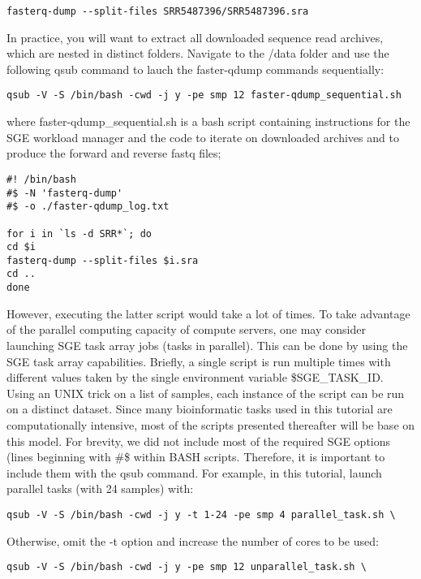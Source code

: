 \begin{verbatim}
fasterq-dump --split-files SRR5487396/SRR5487396.sra
\end{verbatim}

In practice, you will want to extract all downloaded sequence read archives, which are nested in distinct folders. Navigate to the /data folder and use the following qsub command to lauch the faster-qdump commands sequentially:

\begin{verbatim}
qsub -V -S /bin/bash -cwd -j y -pe smp 12 faster-qdump_sequential.sh
\end{verbatim}

where faster-qdump\_sequential.sh is a bash script containing instructions for the SGE workload manager and the code to iterate on downloaded archives and to produce the forward and reverse fastq files;

\begin{verbatim}
#! /bin/bash
#$ -N 'fasterq-dump'
#$ -o ./faster-qdump_log.txt
	
for i in `ls -d SRR*`; do
cd $i
fasterq-dump --split-files $i.sra
cd ..
done
\end{verbatim}


However, executing the latter script would take a lot of times. To take advantage of the parallel computing capacity of compute servers, one may consider launching SGE task array jobs (tasks in parallel). This can be done by using the SGE task array capabilities. Briefly, a single script is run multiple times with different values taken by the single environment variable \$SGE\_TASK\_ID. Using an UNIX trick on a list of samples, each instance of the script can be run on a distinct dataset. Since many bioinformatic tasks used in this tutorial are computationally intensive, most of the scripts presented thereafter will be base on this model. For brevity, we did not include most of the required SGE options (lines beginning with \#\$ within BASH scripts. Therefore, it is important to include them with the qsub command. For example, in this tutorial, launch parallel tasks (with 24 samples) with:
\begin{verbatim}
qsub -V -S /bin/bash -cwd -j y -t 1-24 -pe smp 4 parallel_task.sh \
\end{verbatim}

Otherwise, omit the -t option and increase the number of cores to be used:
\begin{verbatim}
qsub -V -S /bin/bash -cwd -j y -pe smp 12 unparallel_task.sh \
\end{verbatim}


